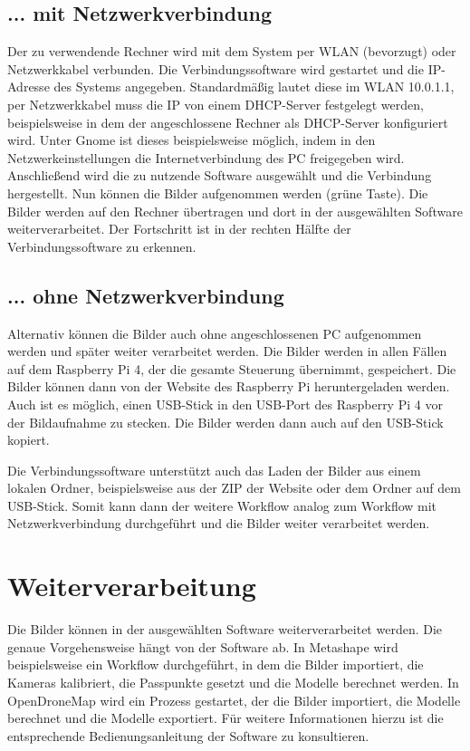 \documentclass[./00PhotoBox.tex]{subfiles}
\begin{document}
\subsection{... mit Netzwerkverbindung}
Der zu verwendende Rechner wird mit dem System per WLAN (bevorzugt) oder Netzwerkkabel verbunden. Die Verbindungssoftware wird gestartet und die IP-Adresse des Systems angegeben. Standardmäßig lautet diese im WLAN 10.0.1.1, per Netzwerkkabel muss die IP von einem DHCP-Server festgelegt werden, beispielsweise in dem der angeschlossene Rechner als DHCP-Server konfiguriert wird. Unter Gnome ist dieses beispielsweise möglich, indem in den Netzwerkeinstellungen die Internetverbindung des PC freigegeben wird.
Anschließend wird die zu nutzende Software ausgewählt und die Verbindung hergestellt.
Nun können die Bilder aufgenommen werden (grüne Taste). Die Bilder werden auf den Rechner übertragen und dort in der ausgewählten Software weiterverarbeitet. Der Fortschritt ist in der rechten Hälfte der Verbindungssoftware zu erkennen.

\subsection{... ohne Netzwerkverbindung}
Alternativ können die Bilder auch ohne angeschlossenen PC aufgenommen werden und später weiter verarbeitet werden. Die Bilder werden in allen Fällen auf dem Raspberry Pi 4, der die gesamte Steuerung übernimmt, gespeichert. Die Bilder können dann von der Website des Raspberry Pi heruntergeladen werden. Auch ist es möglich, einen USB-Stick in den USB-Port des Raspberry Pi 4 vor der Bildaufnahme zu stecken. Die Bilder werden dann auch auf den USB-Stick kopiert.

Die Verbindungssoftware unterstützt auch das Laden der Bilder aus einem lokalen Ordner, beispielsweise aus der ZIP der Website oder dem Ordner auf dem USB-Stick. Somit kann dann der weitere Workflow analog zum Workflow mit Netzwerkverbindung durchgeführt und die Bilder weiter verarbeitet werden.

\section{Weiterverarbeitung}
Die Bilder können in der ausgewählten Software weiterverarbeitet werden. Die genaue Vorgehensweise hängt von der Software ab. In Metashape wird beispielsweise ein Workflow durchgeführt, in dem die Bilder importiert, die Kameras kalibriert, die Passpunkte gesetzt und die Modelle berechnet werden. In OpenDroneMap wird ein Prozess gestartet, der die Bilder importiert, die Modelle berechnet und die Modelle exportiert. Für weitere Informationen hierzu ist die entsprechende Bedienungsanleitung der Software zu konsultieren.
\end{document}
